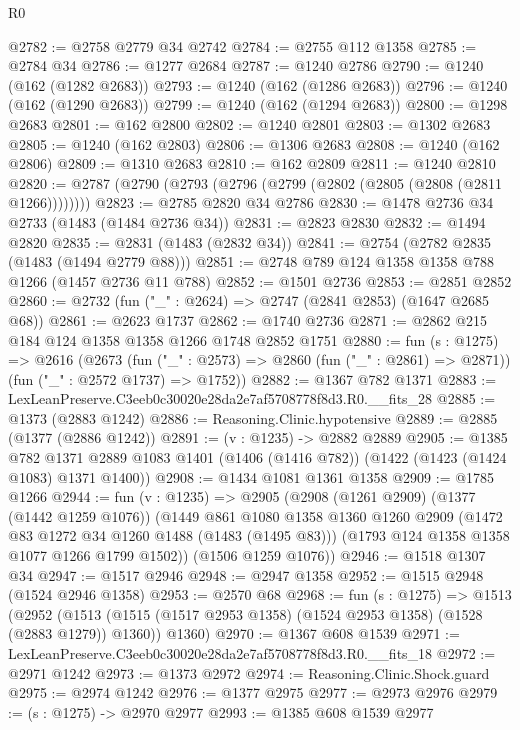 \begin{lexlean}{R0}
\begin{coremodule}
@2782 := @2758 @2779 @34 @2742
@2784 := @2755 @112 @1358
@2785 := @2784 @34
@2786 := @1277 @2684
@2787 := @1240 @2786
@2790 := @1240 (@162 (@1282 @2683))
@2793 := @1240 (@162 (@1286 @2683))
@2796 := @1240 (@162 (@1290 @2683))
@2799 := @1240 (@162 (@1294 @2683))
@2800 := @1298 @2683
@2801 := @162 @2800
@2802 := @1240 @2801
@2803 := @1302 @2683
@2805 := @1240 (@162 @2803)
@2806 := @1306 @2683
@2808 := @1240 (@162 @2806)
@2809 := @1310 @2683
@2810 := @162 @2809
@2811 := @1240 @2810
@2820 := @2787 (@2790 (@2793 (@2796 (@2799 (@2802 (@2805 (@2808 (@2811 @1266))))))))
@2823 := @2785 @2820 @34 @2786
@2830 := @1478 @2736 @34 @2733 (@1483 (@1484 @2736 @34))
@2831 := @2823 @2830
@2832 := @1494 @2820
@2835 := @2831 (@1483 (@2832 @34))
@2841 := @2754 (@2782 @2835 (@1483 (@1494 @2779 @88)))
@2851 := @2748 @789 @124 @1358 @1358 @788 @1266 (@1457 @2736 @11 @788)
@2852 := @1501 @2736
@2853 := @2851 @2852
@2860 := @2732 (fun ("_" : @2624) => @2747 (@2841 @2853) (@1647 @2685 @68))
@2861 := @2623 @1737
@2862 := @1740 @2736
@2871 := @2862 @215 @184 @124 @1358 @1358 @1266 @1748 @2852 @1751
@2880 := fun (s : @1275) =>
  @2616
    (@2673
      (fun ("_" : @2573) => @2860 (fun ("_" : @2861) => @2871))
      (fun ("_" : @2572 @1737) => @1752))
@2882 := @1367 @782 @1371
@2883 := LexLeanPreserve.C3eeb0c30020e28da2e7af5708778f8d3.R0.__fits_28
@2885 := @1373 (@2883 @1242)
@2886 := Reasoning.Clinic.hypotensive
@2889 := @2885 (@1377 (@2886 @1242))
@2891 := (v : @1235) -> @2882 @2889
@2905 := @1385
    @782
    @1371
    @2889
    @1083
    @1401
    (@1406 (@1416 @782))
    (@1422 (@1423 (@1424 @1083) @1371 @1400))
@2908 := @1434 @1081 @1361 @1358
@2909 := @1785 @1266
@2944 := fun (v : @1235) =>
  @2905
    (@2908
      (@1261 @2909)
      (@1377 (@1442 @1259 @1076))
      (@1449
        @861
        @1080
        @1358
        @1360
        @1260
        @2909
        (@1472 @83 @1272 @34 @1260 @1488 (@1483 (@1495 @83)))
        (@1793 @124 @1358 @1358 @1077 @1266 @1799 @1502))
      (@1506 @1259 @1076))
@2946 := @1518 @1307 @34
@2947 := @1517 @2946
@2948 := @2947 @1358
@2952 := @1515 @2948 (@1524 @2946 @1358)
@2953 := @2570 @68
@2968 := fun (s : @1275) =>
  @1513
    (@2952
      (@1513 (@1515 (@1517 @2953 @1358) (@1524 @2953 @1358) (@1528 (@2883 @1279)) @1360))
      @1360)
@2970 := @1367 @608 @1539
@2971 := LexLeanPreserve.C3eeb0c30020e28da2e7af5708778f8d3.R0.__fits_18
@2972 := @2971 @1242
@2973 := @1373 @2972
@2974 := Reasoning.Clinic.Shock.guard
@2975 := @2974 @1242
@2976 := @1377 @2975
@2977 := @2973 @2976
@2979 := (s : @1275) -> @2970 @2977
@2993 := @1385
    @608
    @1539
    @2977

\end{coremodule}
\end{lexlean}
